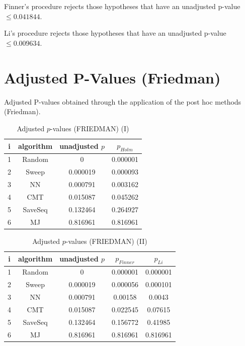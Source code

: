 \documentclass[a4paper,10pt]{article}
\begin{document}
\begin{landscape}
Finner's procedure rejects those hypotheses that have an unadjusted p-value $\le0.041844$.

Li's procedure rejects those hypotheses that have an unadjusted p-value $\le0.009634$.


\newpage

\section{Adjusted P-Values (Friedman)}


Adjusted P-values obtained through the application of the post hoc methods (Friedman).

\begin{table}[!htp]
\centering\small
\begin{tabular}{cccc}
i&algorithm&unadjusted $p$&$p_{Holm}$\\
\hline1&Random&0&0.000001\\2&Sweep&0.000019&0.000093\\3&NN&0.000791&0.003162\\4&CMT&0.015087&0.045262\\5&SaveSeq&0.132464&0.264927\\6&MJ&0.816961&0.816961\\\hline
\end{tabular}
\caption{Adjusted $p$-values (FRIEDMAN) (I)}
\end{table}
\begin{table}[!htp]
\centering\small
\begin{tabular}{ccccc}
i&algorithm&unadjusted $p$&$p_{Finner}$&$p_{Li}$\\
\hline1&Random&0&0.000001&0.000001\\2&Sweep&0.000019&0.000056&0.000101\\3&NN&0.000791&0.00158&0.0043\\4&CMT&0.015087&0.022545&0.07615\\5&SaveSeq&0.132464&0.156772&0.41985\\6&MJ&0.816961&0.816961&0.816961\\\hline
\end{tabular}
\caption{Adjusted $p$-values (FRIEDMAN) (II)}
\end{table}

\newpage
\end{landscape}
\end{document}
